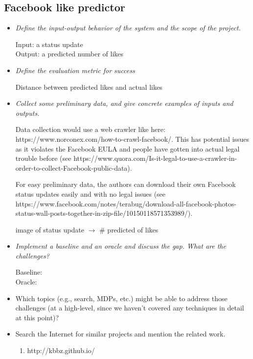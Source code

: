 \documentclass[12pt]{article}
\begin{document}
\subsection{Facebook like predictor}
\begin{itemize}
\item  \emph{Define the input-output behavior of the system and the scope of the project.}
  
  Input: a status update\\
  Output: a predicted number of likes
  
  \item \emph{ Define the evaluation metric for success}

    Distance between predicted likes and actual likes
    
  \item  \emph{Collect some preliminary data, and give concrete examples of inputs and outputs.}

    Data collection would use a web crawler like here:
    https://www.norconex.com/how-to-crawl-facebook/. This has
    potential issues as it violates the Facebook EULA and people have
    gotten into actual legal trouble before (see
    https://www.quora.com/Is-it-legal-to-use-a-crawler-in-order-to-collect-Facebook-public-data).

    For easy preliminary data, the authors can download their own Facebook status updates easily and with no legal issues (see https://www.facebook.com/notes/terabug/download-all-facebook-photos-status-wall-posts-together-in-zip-file/10150118571353989/).
    
    image of status update $\rightarrow$ \# predicted of likes
    
  \item  \emph{Implement a baseline and an oracle and discuss the gap. What are the challenges?}

    Baseline:\\
    Oracle:
    
  \item Which topics (e.g., search, MDPs, etc.) might be able to address those challenges (at a high-level, since we haven't covered any techniques in detail at this point)?
  \item  Search the Internet for similar projects and mention the related work.
    \begin{enumerate}
      \item http://kbbz.github.io/
    \end{enumerate}
\end{itemize}
\end{document}
